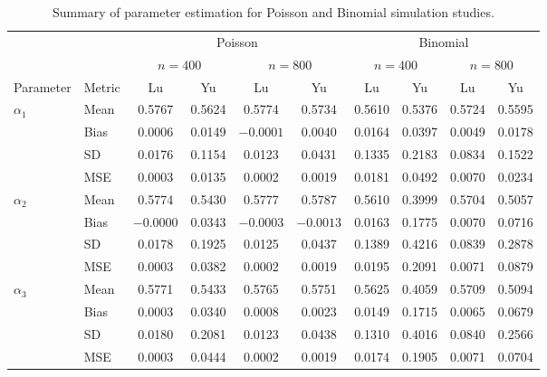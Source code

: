 \begin{table}[ht!]
\centering
\begin{threeparttable}
\caption{Summary of parameter estimation for Poisson and Binomial simulation studies.}
\label{tab:sim_param_pois_bino_main}
\setlength{\tabcolsep}{3.5pt}
\begin{tabular}{llcccccccc}
\toprule
& & \multicolumn{4}{c}{Poisson} & \multicolumn{4}{c}{Binomial} \\
\cmidrule(lr){3-6} \cmidrule(lr){7-10}
& & \multicolumn{2}{c}{$n=400$} & \multicolumn{2}{c}{$n=800$}
  & \multicolumn{2}{c}{$n=400$} & \multicolumn{2}{c}{$n=800$} \\
\cmidrule(lr){3-4} \cmidrule(lr){5-6} \cmidrule(lr){7-8} \cmidrule(lr){9-10}
Parameter & Metric
& Lu & Yu & Lu & Yu
& Lu & Yu & Lu & Yu \\

\midrule

\multirow{4}{*}{$\alpha_{1}$}
& Mean & 0.5767 & 0.5624 & 0.5774 & 0.5734 & 0.5610 & 0.5376 & 0.5724 & 0.5595 \\
& Bias & 0.0006 & 0.0149 & $-0.0001$ & 0.0040 & 0.0164 & 0.0397 & 0.0049 & 0.0178 \\
& SD   & 0.0176 & 0.1154 & 0.0123 & 0.0431 & 0.1335 & 0.2183 & 0.0834 & 0.1522 \\
& MSE  & 0.0003 & 0.0135 & 0.0002 & 0.0019 & 0.0181 & 0.0492 & 0.0070 & 0.0234 \\
\midrule

\multirow{4}{*}{$\alpha_{2}$}
& Mean & 0.5774 & 0.5430 & 0.5777 & 0.5787 & 0.5610 & 0.3999 & 0.5704 & 0.5057 \\
& Bias & $-0.0000$ & 0.0343 & $-0.0003$ & $-0.0013$ & 0.0163 & 0.1775 & 0.0070 & 0.0716 \\
& SD   & 0.0178 & 0.1925 & 0.0125 & 0.0437 & 0.1389 & 0.4216 & 0.0839 & 0.2878 \\
& MSE  & 0.0003 & 0.0382 & 0.0002 & 0.0019 & 0.0195 & 0.2091 & 0.0071 & 0.0879 \\
\midrule

\multirow{4}{*}{$\alpha_{3}$}
& Mean & 0.5771 & 0.5433 & 0.5765 & 0.5751 & 0.5625 & 0.4059 & 0.5709 & 0.5094 \\
& Bias & 0.0003 & 0.0340 & 0.0008 & 0.0023 & 0.0149 & 0.1715 & 0.0065 & 0.0679 \\
& SD   & 0.0180 & 0.2081 & 0.0123 & 0.0438 & 0.1310 & 0.4016 & 0.0840 & 0.2566 \\
& MSE  & 0.0003 & 0.0444 & 0.0002 & 0.0019 & 0.0174 & 0.1905 & 0.0071 & 0.0704 \\
\midrule


\end{tabular}
\end{threeparttable}
\end{table}
